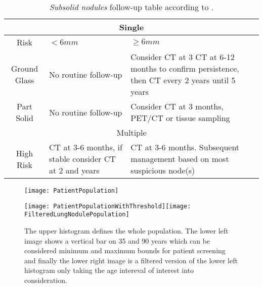 \begin{center}
\begin{table}
\begin{centering}
\begin{tabular}{c|>{\centering}p{}|>{\centering}p{}}
\hline 
\multicolumn{3}{c}{Single}\tabularnewline
\hline 
Risk & $<6mm$ & $\geq6mm$\tabularnewline
\hline 
Ground Glass & No routine follow-up & Consider CT at 3 CT at 6-12 months to confirm persistence, then CT
every 2 years until 5 years\tabularnewline
Part Solid & No routine follow-up & Consider CT at 3 months, PET/CT or tissue sampling\tabularnewline
\hline 
\multicolumn{3}{c}{Multiple}\tabularnewline
\hline 
High Risk & CT at 3-6 months, if stable consider CT at 2 and years & CT at 3-6 months. Subsequent management based on most suspicious node(s)\tabularnewline
\hline 
\end{tabular}
\par\end{centering}
\caption{\label{tab:subsolid_nodules}\emph{Subsolid nodules} follow-up table according
to .}
\end{table}
\vspace*{-44pt}
\par\end{center}

\begin{center}
\begin{figure}
\begin{centering}
\texttt{[image: PatientPopulation]}
\par\end{centering}
\begin{centering}
\texttt{[image: PatientPopulationWithThreshold]}\texttt{[image: FilteredLungNodulePopulation]}
\par\end{centering}
\caption{\label{fig:patient_population}The upper histogram defines the whole \nomeHsl{} population. The lower left image shows a vertical bar on 35 and 90 years which can
be considered minimum and maximum bounds for patient screening and
finally the lower right image is a filtered version of the lower left
histogram only taking the age intereval of interest into consideration.}
\end{figure}
\vspace*{-44pt}
\par\end{center}

